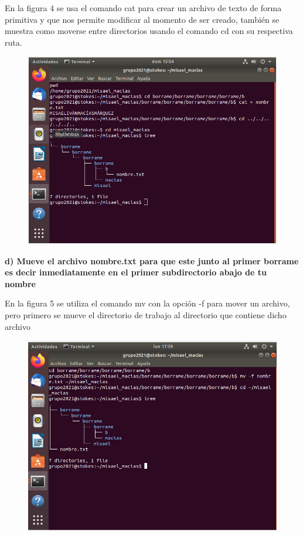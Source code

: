 \documentclass[12pt,a4paper]{article}
\begin{document}
\noindent En la figura 4 se usa el comando cat para crear un archivo de texto de forma primitiva y que nos permite modificar al momento de ser creado, también se muestra como moverse entre directorios usando el comando cd con su respectiva ruta.
\begin{figure}[h!]
    \centering
    \includegraphics[scale = 0.5]{c.1.png}
    \caption{}
\end{figure}


\noindent \textbf{d) Mueve el archivo nombre.txt para que este junto al primer borrame es decir inmediatamente
en el primer subdirectorio abajo de tu nombre}

\noindent En la figura 5 se utiliza el comando mv con la opción -f para mover un archivo, pero primero se mueve el directorio de trabajo al directorio que contiene dicho archivo
\begin{figure}[h!]
    \centering
    \includegraphics[scale = 0.5]{d.1.png}
    \caption{}
\end{figure}
\end{document}
